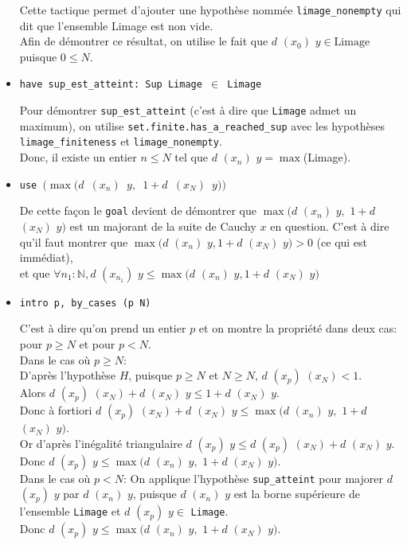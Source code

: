 \begin{itemize}
    
    Cette tactique permet d'ajouter une hypothèse nommée \texttt{limage\_nonempty} qui dit que l'ensemble Limage est non vide.\\ Afin de démontrer ce résultat, on utilise le fait que $d$ $(x_0)$ $y  \in \textrm{Limage}$ puisque $0 \leq N$.
    \item \texttt{have sup\_est\_atteint: Sup Limage $\in$ Limage}
    
    
    Pour démontrer \texttt{sup\_est\_atteint} (c'est à dire que \texttt{Limage} admet un maximum), on utilise \texttt{set.finite.has\_a\_reached\_sup} avec les hypothèses \texttt{limage\_finiteness} et \texttt{limage\_nonempty}.\\ Donc, il existe un entier $n\leq N$ tel que $d$ $(x_n)$ $y= \max$(\textrm{Limage}).
    \item \texttt{use $(\max (d$ $(x_n)$ $y,$ $1+d$ $(x_N)$ $y))$}
    
    
    De cette façon le \texttt{goal} devient de démontrer que $\max(d$ $(x_n)$ $y ,$ $1+d$ $(x_N)$ $y)$ est un majorant de la suite de Cauchy $x$ en question. \newline C'est à dire qu'il faut montrer que $\max(d$ $(x_n)$ $y , 1+d$ $(x_N)$ $y) > 0$ (ce qui est immédiat), \\ et que $\forall n_1 : \mathbb{N}, d$ $(x_{n_1})$ $y \leq \max (d$ $(x_n)$ $y , 1+ d$ $(x_N)$ $y)$
    \item \texttt{intro p, by\_cases (p \geq N)}
    
    
    C'est à dire qu'on prend un entier $p$ et on montre la propriété dans deux cas: pour $p \geq N$ et pour $p < N$. \\
    Dans le cas où $p \geq N$: \\ D'après l'hypothèse $H$, puisque $p \geq N$ et $N \geq N$, $d$ $(x_p)$ $(x_N) < 1$. \\ Alors $d$ $(x_p)$ $(x_N) + d$ $(x_N)$ $y \leq 1 + d$ $(x_N)$ $y$. \\ Donc à fortiori $d$ $(x_p)$ $(x_N) + d$ $(x_N)$ $y \leq \max (d$ $(x_n)$ $y ,$ $1 + d$ $(x_N)$ $y)$. 
    \\ Or d'après l'inégalité triangulaire $d$ $(x_p)$ $y \leq d$ $(x_p)$ $(x_N) + d$ $(x_N)$ $y$. \\ Donc $d$ $(x_p)$ $y \leq \max (d$ $(x_n)$ $y ,$ $1 + d$ $(x_N)$ $y)$.\\
    Dans le cas où $p < N$: \newline On applique l'hypothèse \texttt{sup\_atteint} pour majorer $d$ $(x_p)$ $y$ par $d$ $(x_n)$ $y$, puisque $d$ $(x_n)$ $y$ est la borne supérieure de l'ensemble \texttt{Limage} et $d$ $(x_p)$ $y \in$ \texttt{Limage}.\\
    Donc $d$ $(x_p)$ $y \leq \max (d$ $(x_n)$ $y ,$ $1 + d$ $(x_N)$ $y)$.
\end{itemize}
